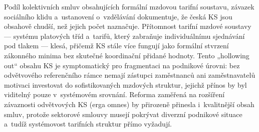 Podíl kolektivních smluv obsahujících formální mzdovou tarifní soustavu, závazek sociálního klidu a~ustanovení o~vzdělávání dokumentuje, že česká \ac{KS} jsou obsahově chudší, než jejich počet naznačuje.
Přítomnost tarifní mzdové soustavy --- systému platových tříd a~tarifů, který zabraňuje individuálnímu sjednávání pod tlakem --- klesá, přičemž \ac{KS} stále více fungují jako formální stvrzení zákonného minima bez skutečné koordinační přidané hodnoty.
Tento „hollowing out“ obsahu \ac{KS} je symptomatický pro fragmentaci na podnikové úrovni: bez odvětvového referenčního rámce nemají zástupci zaměstnanců ani zaměstnavatelů motivaci investovat do sofistikovaných mzdových struktur, jejichž přínos by byl viditelný pouze v~systémovém srovnání.
Reforma zaměřená na rozšíření závaznosti odvětvových \ac{KS} (erga omnes) by přirozeně přinesla i~kvalitnější obsah smluv, protože sektorové smlouvy musejí pokrývat diverzní podnikové situace a~tudíž systémovost tarifních struktur přímo vyžadují.



